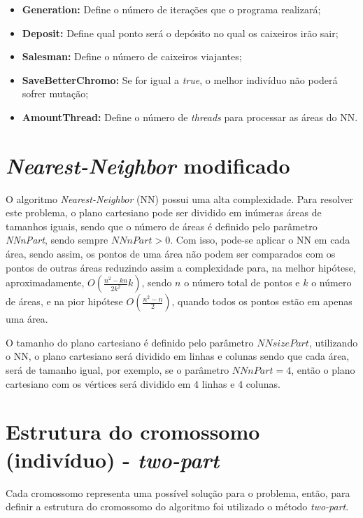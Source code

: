 \documentclass[12pt,openright,a4paper,twoside]{tcc}
\begin{document}
\begin{itemize}
                \item \textbf{Generation:} Define o número de iterações que o programa realizará;
                \item \textbf{Deposit:} Define qual ponto será o depósito no qual os caixeiros irão sair;
                \item \textbf{Salesman:} Define o número de caixeiros viajantes;
                \item \textbf{SaveBetterChromo:} Se for igual a \textit{true}, o melhor indivíduo não poderá sofrer mutação;
                \item \textbf{AmountThread:} Define o número de \textit{threads} para processar as áreas do NN.
            \end{itemize}   

		\section {\textit{Nearest-Neighbor} modificado}

		O algoritmo \textit{Nearest-Neighbor} (NN) possui uma alta complexidade. Para resolver este problema, o plano cartesiano pode ser dividido em inúmeras áreas de tamanhos iguais, sendo que o número de áreas é definido pelo parâmetro \textit{NNnPart}, sendo sempre $NNnPart > 0$. 
		Com isso, pode-se aplicar o NN em cada área, sendo assim, os pontos de uma área não podem ser comparados com os pontos de outras áreas reduzindo assim a complexidade para, na melhor hipótese, aproximadamente, $O(\frac{n^2-kn}{2k^2}k)$, sendo $n$ o número total de pontos e $k$ o número de áreas, e na pior hipótese $O(\frac{n^2-n}{2})$, quando todos os pontos estão em apenas uma área. 
		
		O tamanho do plano cartesiano é definido pelo parâmetro $NNsizePart$, utilizando o NN, o plano cartesiano será dividido em linhas e colunas sendo que cada área, será de tamanho igual, por exemplo, se o parâmetro $NNnPart = 4$, então o plano cartesiano com os vértices será dividido em 4 linhas e 4 colunas.  
		
		
		\section{Estrutura do cromossomo (indivíduo) - \textit{two-part}}
		

			Cada cromossomo representa uma possível solução para o problema, então, para definir a estrutura do cromossomo do algoritmo foi utilizado o método \textit{two-part}.
\end{document}
